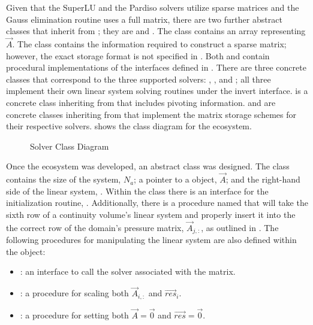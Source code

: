 Given that the SuperLU and the Pardiso solvers utilize sparse matrices and the Gauss elimination routine uses a full matrix, there are two further abstract classes that inherit from ; they are  and .
The  class contains an array representing $\vec{A}$.
The  class contains the information required to construct a sparse matrix; however, the exact storage format is not specified in .
Both  and  contain procedural implementations of the interfaces defined in .
There are three concrete classes that correspond to the three supported solvers: , , and ; all three implement their own linear system solving routines under the invert interface.
 is a concrete class inheriting from  that includes pivoting information.
 and  are concrete classes inheriting from  that implement the matrix storage schemes for their respective solvers.
 shows the class diagram for the  ecosystem.

\begin{figure}[ht!]
\singlespace\centering

\caption{Solver Class Diagram}
\label{fig:solverClassDiagram}
\end{figure}

Once the  ecosystem was developed, an abstract  class was designed.
The  class contains the size of the system, $N_{a}$; a pointer to a  object, $\vec{A}$; and the right-hand side of the linear system, .
Within the  class there is an interface for the initialization routine, .
Additionally, there is a procedure named  that will take the sixth row of a continuity volume's linear system and properly insert it into the the correct row of the domain's pressure matrix, $\vec{A}_{j,:}$, as outlined in .
The following procedures for manipulating the linear system are also defined within the  object:

\begin{itemize}
\item{  : an interface to call the solver associated with the matrix.}
\item{  : a procedure for scaling both $\vec{A}_{i, :}$ and $\vec{res}_{i}$.}
\item{  : a procedure for setting both $\vec{A} = \vec{0}$ and $\vec{res} = \vec{0}$.}
\end{itemize}


